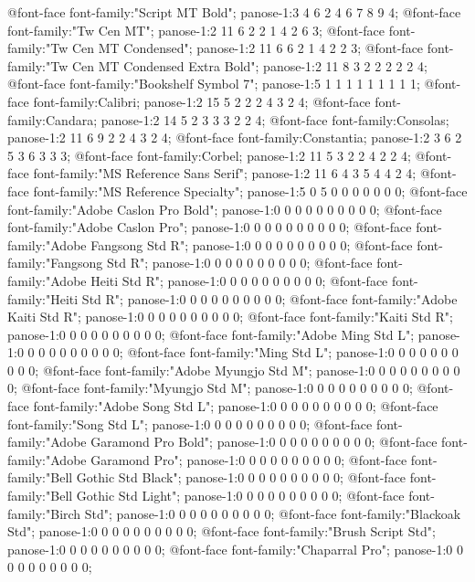 @font-face
	{font-family:"Script MT Bold";
	panose-1:3 4 6 2 4 6 7 8 9 4;}
@font-face
	{font-family:"Tw Cen MT";
	panose-1:2 11 6 2 2 1 4 2 6 3;}
@font-face
	{font-family:"Tw Cen MT Condensed";
	panose-1:2 11 6 6 2 1 4 2 2 3;}
@font-face
	{font-family:"Tw Cen MT Condensed Extra Bold";
	panose-1:2 11 8 3 2 2 2 2 2 4;}
@font-face
	{font-family:"Bookshelf Symbol 7";
	panose-1:5 1 1 1 1 1 1 1 1 1;}
@font-face
	{font-family:Calibri;
	panose-1:2 15 5 2 2 2 4 3 2 4;}
@font-face
	{font-family:Candara;
	panose-1:2 14 5 2 3 3 3 2 2 4;}
@font-face
	{font-family:Consolas;
	panose-1:2 11 6 9 2 2 4 3 2 4;}
@font-face
	{font-family:Constantia;
	panose-1:2 3 6 2 5 3 6 3 3 3;}
@font-face
	{font-family:Corbel;
	panose-1:2 11 5 3 2 2 4 2 2 4;}
@font-face
	{font-family:"MS Reference Sans Serif";
	panose-1:2 11 6 4 3 5 4 4 2 4;}
@font-face
	{font-family:"MS Reference Specialty";
	panose-1:5 0 5 0 0 0 0 0 0 0;}
@font-face
	{font-family:"Adobe Caslon Pro Bold";
	panose-1:0 0 0 0 0 0 0 0 0 0;}
@font-face
	{font-family:"Adobe Caslon Pro";
	panose-1:0 0 0 0 0 0 0 0 0 0;}
@font-face
	{font-family:"Adobe Fangsong Std R";
	panose-1:0 0 0 0 0 0 0 0 0 0;}
@font-face
	{font-family:"\@Adobe Fangsong Std R";
	panose-1:0 0 0 0 0 0 0 0 0 0;}
@font-face
	{font-family:"Adobe Heiti Std R";
	panose-1:0 0 0 0 0 0 0 0 0 0;}
@font-face
	{font-family:"\@Adobe Heiti Std R";
	panose-1:0 0 0 0 0 0 0 0 0 0;}
@font-face
	{font-family:"Adobe Kaiti Std R";
	panose-1:0 0 0 0 0 0 0 0 0 0;}
@font-face
	{font-family:"\@Adobe Kaiti Std R";
	panose-1:0 0 0 0 0 0 0 0 0 0;}
@font-face
	{font-family:"Adobe Ming Std L";
	panose-1:0 0 0 0 0 0 0 0 0 0;}
@font-face
	{font-family:"\@Adobe Ming Std L";
	panose-1:0 0 0 0 0 0 0 0 0 0;}
@font-face
	{font-family:"Adobe Myungjo Std M";
	panose-1:0 0 0 0 0 0 0 0 0 0;}
@font-face
	{font-family:"\@Adobe Myungjo Std M";
	panose-1:0 0 0 0 0 0 0 0 0 0;}
@font-face
	{font-family:"Adobe Song Std L";
	panose-1:0 0 0 0 0 0 0 0 0 0;}
@font-face
	{font-family:"\@Adobe Song Std L";
	panose-1:0 0 0 0 0 0 0 0 0 0;}
@font-face
	{font-family:"Adobe Garamond Pro Bold";
	panose-1:0 0 0 0 0 0 0 0 0 0;}
@font-face
	{font-family:"Adobe Garamond Pro";
	panose-1:0 0 0 0 0 0 0 0 0 0;}
@font-face
	{font-family:"Bell Gothic Std Black";
	panose-1:0 0 0 0 0 0 0 0 0 0;}
@font-face
	{font-family:"Bell Gothic Std Light";
	panose-1:0 0 0 0 0 0 0 0 0 0;}
@font-face
	{font-family:"Birch Std";
	panose-1:0 0 0 0 0 0 0 0 0 0;}
@font-face
	{font-family:"Blackoak Std";
	panose-1:0 0 0 0 0 0 0 0 0 0;}
@font-face
	{font-family:"Brush Script Std";
	panose-1:0 0 0 0 0 0 0 0 0 0;}
@font-face
	{font-family:"Chaparral Pro";
	panose-1:0 0 0 0 0 0 0 0 0 0;}
